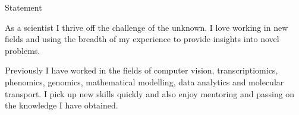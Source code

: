 \begin{rubric}{Statement}
\end{rubric}
    \vspace{-0.5cm}
    As a scientist I thrive off the challenge of the unknown. I love working in
    new fields and using the breadth of my experience to provide insights into
    novel problems.  

    \vspace{0.2cm}

    Previously I have worked in the fields of computer vision, transcriptiomics,
    phenomics, genomics, mathematical modelling, data analytics and molecular
    transport. I pick up new skills quickly and also enjoy mentoring and passing
    on the knowledge I have obtained.


